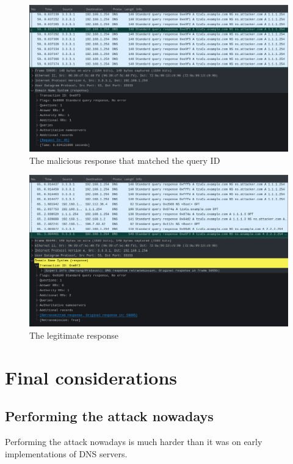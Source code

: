 \documentclass[11pt,a4paper]{article}
\begin{document}
\begin{figure}[h!]
  \includegraphics[width=\linewidth]{wireshark-2.png}
  \caption{The malicious response that matched the query ID}
  \label{fig:wireshark-2}
\end{figure}

\begin{figure}[h!]
  \includegraphics[width=\linewidth]{wireshark-3.png}
  \caption{The legitimate response}
  \label{fig:wireshark-3}
\end{figure}

\clearpage

\section{Final considerations}
\label{sec:final-considerations}

\subsection{Performing the attack nowadays}

Performing the attack nowadays is much harder than it was on early implementations of DNS servers. 
\end{document}

